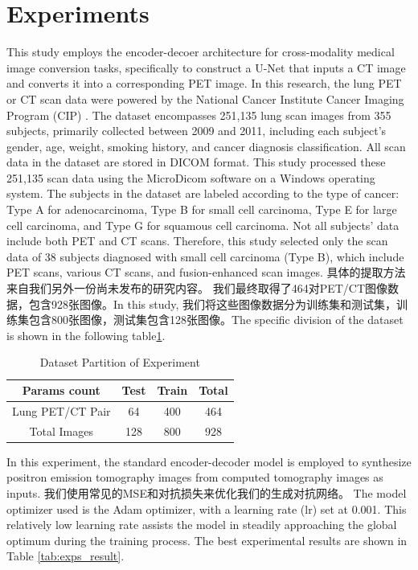 \documentclass[twocolumn]{article}
\begin{document}
\section{Experiments}
This study employs the encoder-decoer architecture for cross-modality medical image conversion tasks, specifically to construct a U-Net that inputs a CT image and converts it into a corresponding PET image. In this research, the lung PET or CT scan data were powered by the National Cancer Institute Cancer Imaging Program (CIP) \cite{li_large-scale_2020}.  The dataset encompasses 251,135 lung scan images from 355 subjects, primarily collected between 2009 and 2011, including each subject's gender, age, weight, smoking history, and cancer diagnosis classification. All scan data in the dataset are stored in DICOM format. This study processed these 251,135 scan data using the MicroDicom software on a Windows operating system. The subjects in the dataset are labeled according to the type of cancer: Type A for adenocarcinoma, Type B for small cell carcinoma, Type E for large cell carcinoma, and Type G for squamous cell carcinoma. Not all subjects' data include both PET and CT scans. Therefore, this study selected only the scan data of 38 subjects diagnosed with small cell carcinoma (Type B), which include PET scans, various CT scans, and fusion-enhanced scan images. 具体的提取方法来自我们另外一份尚未发布的研究内容。 我们最终取得了464对PET/CT图像数据，包含928张图像。In this study, 我们将这些图像数据分为训练集和测试集，训练集包含800张图像，测试集包含128张图像。The specific division of the dataset is shown in the following table\ref{tab:dataset_partition_1}.

\begin{table}[h]
	\centering
	\caption{Dataset Partition of Experiment}
	\label{tab:dataset_partition_1}
	\begin{tabular}{cccc}
		\toprule
		Params count     & Test & Train & Total \\
		\midrule
		Lung PET/CT Pair & 64   & 400   & 464   \\
		Total Images     & 128  & 800   & 928   \\
		\bottomrule
	\end{tabular}
\end{table}

In this experiment, the standard encoder-decoder model is employed to synthesize positron emission tomography images from computed tomography images as inputs. 我们使用常见的MSE和对抗损失来优化我们的生成对抗网络。 The model optimizer used is the Adam optimizer, with a learning rate (lr) set at 0.001. This relatively low learning rate assists the model in steadily approaching the global optimum during the training process. The best experimental results are shown in Table \ref{tab:exps_result}. 
\end{document}
